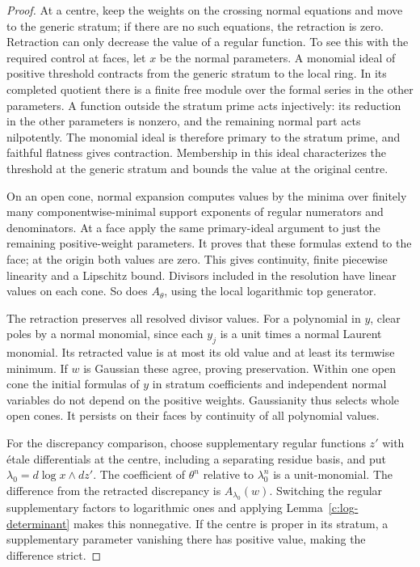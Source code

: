 \begin{proof}
At a centre, keep the weights on the crossing normal equations
and move to the generic stratum; if there are no such equations,
the retraction is zero.  Retraction can only decrease the value
of a regular function.  To see this with the required control at
faces, let \(x\) be the normal parameters.  A monomial ideal of
positive threshold contracts from the generic stratum to the
local ring.  In its completed quotient there is a finite free
module over the formal series in the other parameters.  A
function outside the stratum prime acts injectively: its reduction
in the other parameters is nonzero, and the remaining normal part
acts nilpotently.  The monomial ideal is therefore primary to
the stratum prime, and faithful flatness gives contraction.
Membership in this ideal characterizes the threshold at the
generic stratum and bounds the value at the original centre.

On an open cone, normal expansion computes values by the minima
over finitely many componentwise-minimal support exponents of
regular numerators and denominators.  At a face apply the same
primary-ideal argument to just the remaining positive-weight
parameters.  It proves that these formulas extend to the face;
at the origin both values are zero.  This gives continuity, finite
piecewise linearity and a Lipschitz bound.  Divisors included in
the resolution have linear values on each cone.  So does
\(A_\theta\), using the local logarithmic top generator.

The retraction preserves all resolved divisor values.  For a
polynomial in \(y\), clear poles by a normal monomial, since each
\(y_j\) is a unit times a normal Laurent monomial.  Its retracted
value is at most its old value and at least its termwise minimum.
If \(w\) is Gaussian these agree, proving preservation.
Within one open cone the initial formulas of \(y\) in stratum
coefficients and independent normal variables do not depend on
the positive weights.  Gaussianity thus selects whole open cones.
It persists on their faces by continuity of all polynomial values.

For the discrepancy comparison, choose supplementary regular
functions \(z'\) with étale differentials at the centre, including
a separating residue basis, and put
\(\lambda_0=d\log x\wedge dz'\).  The coefficient of \(\theta^n\)
relative to \(\lambda_0^n\) is a unit-monomial.  The difference
from the retracted discrepancy is \(A_{\lambda_0}(w)\).
Switching the regular supplementary factors to logarithmic ones
and applying Lemma~\ref{c:log-determinant} makes this nonnegative.
If the centre is proper in its stratum, a supplementary parameter
vanishing there has positive value, making the difference strict.


\end{proof}
